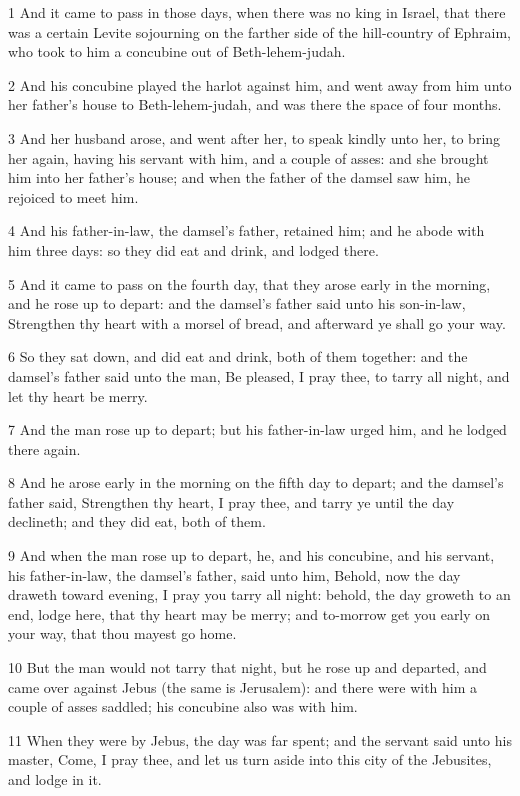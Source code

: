 \par 1 And it came to pass in those days, when there was no king in Israel, that there was a certain Levite sojourning on the farther side of the hill-country of Ephraim, who took to him a concubine out of Beth-lehem-judah.
\par 2 And his concubine played the harlot against him, and went away from him unto her father's house to Beth-lehem-judah, and was there the space of four months.
\par 3 And her husband arose, and went after her, to speak kindly unto her, to bring her again, having his servant with him, and a couple of asses: and she brought him into her father's house; and when the father of the damsel saw him, he rejoiced to meet him.
\par 4 And his father-in-law, the damsel's father, retained him; and he abode with him three days: so they did eat and drink, and lodged there.
\par 5 And it came to pass on the fourth day, that they arose early in the morning, and he rose up to depart: and the damsel's father said unto his son-in-law, Strengthen thy heart with a morsel of bread, and afterward ye shall go your way.
\par 6 So they sat down, and did eat and drink, both of them together: and the damsel's father said unto the man, Be pleased, I pray thee, to tarry all night, and let thy heart be merry.
\par 7 And the man rose up to depart; but his father-in-law urged him, and he lodged there again.
\par 8 And he arose early in the morning on the fifth day to depart; and the damsel's father said, Strengthen thy heart, I pray thee, and tarry ye until the day declineth; and they did eat, both of them.
\par 9 And when the man rose up to depart, he, and his concubine, and his servant, his father-in-law, the damsel's father, said unto him, Behold, now the day draweth toward evening, I pray you tarry all night: behold, the day groweth to an end, lodge here, that thy heart may be merry; and to-morrow get you early on your way, that thou mayest go home.
\par 10 But the man would not tarry that night, but he rose up and departed, and came over against Jebus (the same is Jerusalem): and there were with him a couple of asses saddled; his concubine also was with him.
\par 11 When they were by Jebus, the day was far spent; and the servant said unto his master, Come, I pray thee, and let us turn aside into this city of the Jebusites, and lodge in it.
